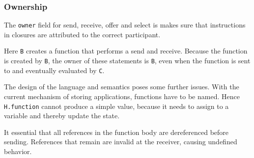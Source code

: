 \documentclass[runningheads]{llncs}
\newenvironment{Shaded}{}{}
\newcommand{\KeywordTok}[1]{\textcolor[rgb]{0.00,0.44,0.13}{\textbf{#1}}}
\newcommand{\DataTypeTok}[1]{\textcolor[rgb]{0.56,0.13,0.00}{#1}}
\newcommand{\DecValTok}[1]{\textcolor[rgb]{0.25,0.63,0.44}{#1}}
\newcommand{\StringTok}[1]{\textcolor[rgb]{0.25,0.44,0.63}{#1}}
\newcommand{\OtherTok}[1]{\textcolor[rgb]{0.00,0.44,0.13}{#1}}
\newcommand{\FunctionTok}[1]{\textcolor[rgb]{0.02,0.16,0.49}{#1}}
\newcommand{\NormalTok}[1]{#1}
\begin{document}
\subsubsection{Ownership}\label{ownership}

The \texttt{owner} field for send, receive, offer and select is makes
sure that instructions in closures are attributed to the correct
participant.

\begin{Shaded}
\end{Shaded}

Here \texttt{B} creates a function that performs a send and receive.
Because the function is created by \texttt{B}, the owner of these
statements is \texttt{B}, even when the function is sent to and
eventually evaluated by \texttt{C}.

The design of the language and semantics poses some further issues. With
the current mechanism of storing applications, functions have to be
named. Hence \texttt{H.function} cannot produce a simple value, because
it needs to assign to a variable and thereby update the state.

It essential that all references in the function body are dereferenced
before sending. References that remain are invalid at the receiver,
causing undefined behavior.
\end{document}
